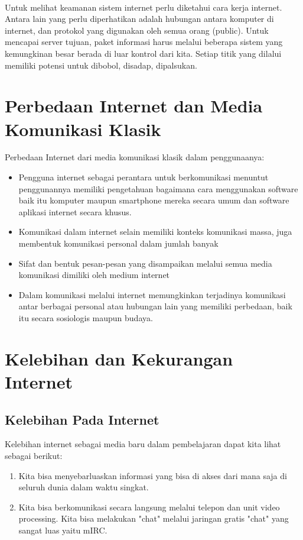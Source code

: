 \documentclass[12pt, a4paper]{article}
\begin{document}
\paragraph{} Untuk melihat keamanan sistem internet perlu diketahui cara kerja internet. Antara lain yang perlu diperhatikan adalah hubungan antara komputer di internet, dan protokol yang digunakan oleh semua orang (public). Untuk mencapai server tujuan, paket informasi harus melalui beberapa sistem yang kemungkinan besar berada di luar kontrol dari kita. Setiap titik yang dilalui memiliki potensi untuk dibobol, disadap, dipalsukan.

\section{Perbedaan Internet dan Media Komunikasi Klasik}
Perbedaan Internet dari media komunikasi klasik dalam penggunaanya:
\begin{itemize}
\item Pengguna internet sebagai perantara untuk berkomunikasi menuntut penggunannya memiliki pengetahuan bagaimana cara menggunakan software baik itu komputer maupun smartphone mereka secara umum dan software aplikasi internet secara khusus.
\item Komunikasi dalam internet selain memiliki konteks komunikasi massa, juga membentuk komunikasi personal dalam jumlah banyak
\item Sifat dan bentuk pesan-pesan yang disampaikan melalui semua media komunikasi dimiliki oleh medium internet
\item Dalam komunikasi melalui internet memungkinkan terjadinya komunikasi antar berbagai personal atau hubungan lain yang memiliki perbedaan, baik itu secara sosiologis maupun budaya.
\end{itemize}

\section{Kelebihan dan Kekurangan Internet}
\subsection{Kelebihan Pada Internet}
    Kelebihan internet sebagai media baru dalam pembelajaran dapat kita lihat sebagai berikut:
\begin{enumerate}
\item Kita bisa menyebarluaskan informasi yang bisa di akses dari mana saja di seluruh dunia dalam waktu singkat.
\item Kita bisa berkomunikasi secara langsung melalui telepon dan unit video processing. Kita bisa melakukan "chat" melalui jaringan gratis "chat" yang sangat luas yaitu mIRC.
\end{enumerate}
\end{document}
